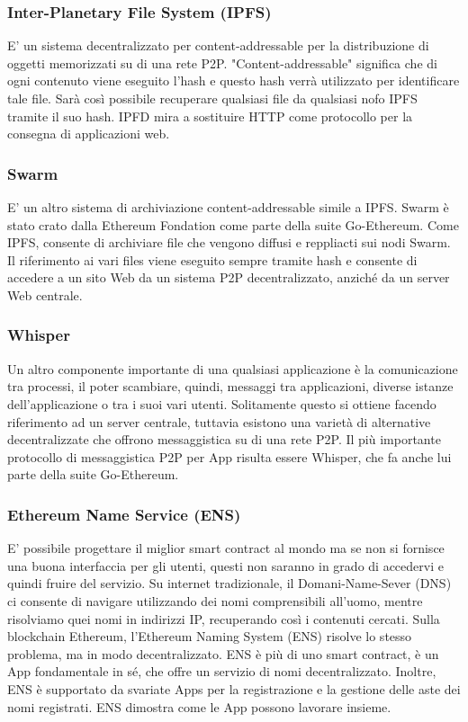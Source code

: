 \subsubsection{Inter-Planetary File System (IPFS)}
E' un sistema decentralizzato per content-addressable per la distribuzione di oggetti memorizzati su di una rete P2P. "Content-addressable" significa che di ogni contenuto viene eseguito l'hash e questo hash verrà utilizzato per identificare tale file. Sarà così possibile recuperare qualsiasi file da qualsiasi nofo IPFS tramite il suo hash. IPFD mira a sostituire HTTP come protocollo per la consegna di applicazioni web.

\subsubsection{Swarm}
E' un altro sistema di archiviazione content-addressable simile a IPFS. Swarm è stato crato dalla Ethereum Fondation come parte della suite Go-Ethereum. Come IPFS, consente di archiviare file che vengono diffusi e reppliacti sui nodi Swarm. Il riferimento ai vari files viene eseguito sempre tramite hash e consente di accedere a un sito Web da un sistema P2P decentralizzato, anziché da un server Web centrale.

\subsubsection{Whisper}
Un altro componente importante di una qualsiasi applicazione è la comunicazione tra processi, il poter scambiare, quindi, messaggi tra applicazioni, diverse istanze dell'applicazione o tra i suoi vari utenti. Solitamente questo si ottiene facendo riferimento ad un server centrale, tuttavia esistono una varietà di alternative decentralizzate che offrono messaggistica su di una rete P2P. Il più importante protocollo di messaggistica P2P per \DH App risulta essere Whisper, che fa anche lui parte della suite Go-Ethereum.

\subsubsection{Ethereum Name Service (ENS)}
E' possibile progettare il miglior smart contract al mondo ma se non si fornisce una buona interfaccia per gli utenti, questi non saranno in grado di accedervi e quindi fruire del servizio. Su internet tradizionale, il Domani-Name-Sever (DNS) ci consente di navigare utilizzando dei nomi comprensibili all'uomo, mentre risolviamo quei nomi in indirizzi IP, recuperando così i contenuti cercati. Sulla blockchain Ethereum, l'Ethereum Naming System (ENS) risolve lo stesso problema, ma in modo decentralizzato. ENS è più di uno smart contract, è un \DH App fondamentale in sé, che offre un servizio di nomi decentralizzato. Inoltre, ENS è supportato da svariate \DH Apps per la registrazione e la gestione delle aste dei nomi registrati. ENS dimostra come le \DH App possono lavorare insieme. 

